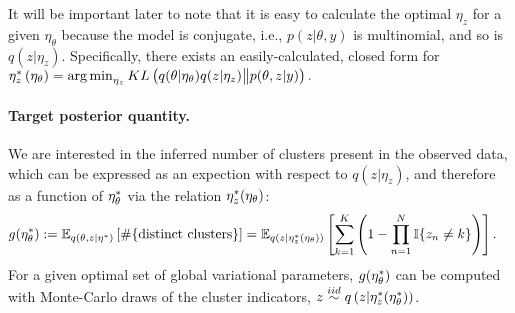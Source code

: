It will be important later to note that it is easy to calculate
the optimal $\eta_z$ for a given $\eta_\theta$ because the model is
conjugate, i.e., $p\left(z \vert \theta, y\right)$ is multinomial,
and so is $q\left(z \vert \eta_z\right)$.  Specifically, there
exists an easily-calculated, closed form for
%
$
\eta_z^{*}\left(\eta_\theta\right) = \operatorname*{arg\,min}_{\eta_z}
    KL\left(
    q(\theta \vert \eta_\theta) q( z \vert \eta_z)
        \big\| p(\theta, z | y)
    \right).
$
%



\paragraph{Target posterior quantity.}

We are interested in the inferred number of clusters present in the observed
data, which can be expressed as an expection with respect to
$q\left(z \vert \eta_z \right)$, and therefore as a function of
$\eta_\theta^{*}$ via the relation $\eta_z^{*}(\eta_\theta)$:
%
\begin{align}
g(\eta_\theta^{*}) &:=
\mathbb{E}_{q(\theta, z \vert \eta^{*})} \left[ \#\{\text{distinct clusters}\} \right]  =
\mathbb{E}_{q(z \vert \eta_z^{*}(\eta_\theta))} \left[
    \sum_{k=1}^K \left(1 - \prod_{n=1}^N \mathbb{I}\{z_n \ne k\} \right) \right].
    \label{eq:expected_num_clusters}
\end{align}
%
For a given optimal set of global variational parameters,
$g(\eta_\theta^{*})$ can be computed with Monte-Carlo draws of the cluster
indicators,
$z \stackrel{iid}{\sim} q\left(z \vert \eta_z^{*}(\eta_\theta^{*})\right)$.

